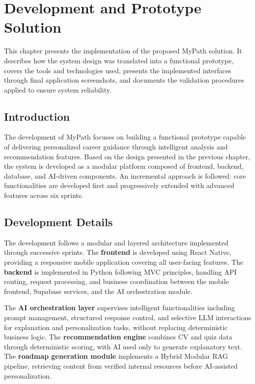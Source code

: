 \documentclass[12pt,a4paper]{article}
\begin{document}
\clearpage

\section{Development and Prototype Solution}

This chapter presents the implementation of the proposed MyPath solution. It describes how the system design was translated into a functional prototype, covers the tools and technologies used, presents the implemented interfaces through final application screenshots, and documents the validation procedures applied to ensure system reliability.

\subsection{Introduction}

The development of MyPath focuses on building a functional prototype capable of delivering personalized career guidance through intelligent analysis and recommendation features. Based on the design presented in the previous chapter, the system is developed as a modular platform composed of frontend, backend, database, and AI-driven components. An incremental approach is followed: core functionalities are developed first and progressively extended with advanced features across six sprints.

\subsection{Development Details}

The development follows a modular and layered architecture implemented through successive sprints. The \textbf{frontend} is developed using React Native, providing a responsive mobile application covering all user-facing features. The \textbf{backend} is implemented in Python following MVC principles, handling API routing, request processing, and business coordination between the mobile frontend, Supabase services, and the AI orchestration module.

The \textbf{AI orchestration layer} supervises intelligent functionalities including prompt management, structured response control, and selective LLM interactions for explanation and personalization tasks, without replacing deterministic business logic. The \textbf{recommendation engine} combines CV and quiz data through deterministic scoring, with AI used only to generate explanatory text. The \textbf{roadmap generation module} implements a Hybrid Modular RAG pipeline, retrieving content from verified internal resources before AI-assisted personalization.
\end{document}
